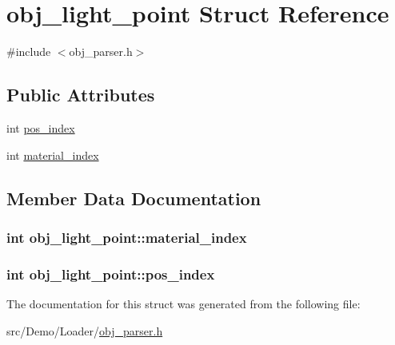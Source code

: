 \hypertarget{structobj__light__point}{\section{obj\+\_\+light\+\_\+point Struct Reference}
\label{structobj__light__point}
}


{\ttfamily \#include $<$obj\+\_\+parser.\+h$>$}

\subsection*{Public Attributes}
\begin{DoxyCompactItemize}
\item 
int \hyperlink{structobj__light__point_af1cc014add4a2347bfe42c679b045a33}{pos\+\_\+index}
\item 
int \hyperlink{structobj__light__point_af1b77673d08020affbb95e3f0bf75f4a}{material\+\_\+index}
\end{DoxyCompactItemize}


\subsection{Member Data Documentation}
\hypertarget{structobj__light__point_af1b77673d08020affbb95e3f0bf75f4a}{
\subsubsection[{material\+\_\+index}]{\setlength{\rightskip}{0pt plus 5cm}int obj\+\_\+light\+\_\+point\+::material\+\_\+index}}\label{structobj__light__point_af1b77673d08020affbb95e3f0bf75f4a}
\hypertarget{structobj__light__point_af1cc014add4a2347bfe42c679b045a33}{
\subsubsection[{pos\+\_\+index}]{\setlength{\rightskip}{0pt plus 5cm}int obj\+\_\+light\+\_\+point\+::pos\+\_\+index}}\label{structobj__light__point_af1cc014add4a2347bfe42c679b045a33}


The documentation for this struct was generated from the following file\+:\begin{DoxyCompactItemize}
\item 
src/\+Demo/\+Loader/\hyperlink{obj__parser_8h}{obj\+\_\+parser.\+h}\end{DoxyCompactItemize}
